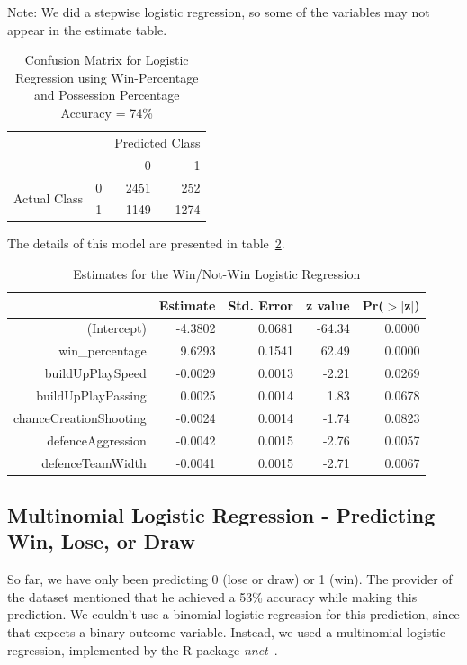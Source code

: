 \documentclass[11pt]{article}
\begin{document}
Note: We did a stepwise logistic regression, so some of the variables may not appear in the estimate table.

\begin{table}[ht!]
\centering
\begin{tabular}{|l|l|r|r|}
\hline
\multicolumn{2}{|l|}{\multirow{2}{*}{}} & \multicolumn{2}{l|}{Predicted Class} \\ \cline{3-4}
\multicolumn{2}{|l|}{}                  & 0                 & 1                \\ \hline
\multirow{2}{*}{Actual Class}    & 0    & 2451              & 252              \\ \cline{2-4}
                                 & 1    & 1149              & 1274             \\ \hline
\end{tabular}
\caption{Confusion Matrix for Logistic Regression using Win-Percentage and Possession Percentage\\Accuracy = 74\%}
\label{tab:logistic-fusion2}
\end{table}

The details of this model are presented in table~\ref{tab:logistic-estimate2}.
\begin{table}[h!]
\centering
\begin{tabular}{rrrrr}
  \hline
 & Estimate & Std. Error & z value & Pr($>$$|$z$|$) \\
  \hline
(Intercept) & -4.3802 & 0.0681 & -64.34 & 0.0000 \\
  win\_percentage & 9.6293 & 0.1541 & 62.49 & 0.0000 \\
  buildUpPlaySpeed & -0.0029 & 0.0013 & -2.21 & 0.0269 \\
  buildUpPlayPassing & 0.0025 & 0.0014 & 1.83 & 0.0678 \\
  chanceCreationShooting & -0.0024 & 0.0014 & -1.74 & 0.0823 \\
  defenceAggression & -0.0042 & 0.0015 & -2.76 & 0.0057 \\
  defenceTeamWidth & -0.0041 & 0.0015 & -2.71 & 0.0067 \\
   \hline
\end{tabular}
\caption{Estimates for the Win/Not-Win Logistic Regression}
\label{tab:logistic-estimate2}
\end{table}

\subsection{Multinomial Logistic Regression - Predicting Win, Lose, or Draw}
So far, we have only been predicting 0 (lose or draw) or 1 (win).
The provider of the dataset mentioned that he achieved a 53\% accuracy while making this prediction.
We couldn't use a binomial logistic regression for this prediction, since that expects a binary outcome variable.
Instead, we used a multinomial logistic regression, implemented by the R package \textit{nnet}~\cite{nnet}.
\end{document}
